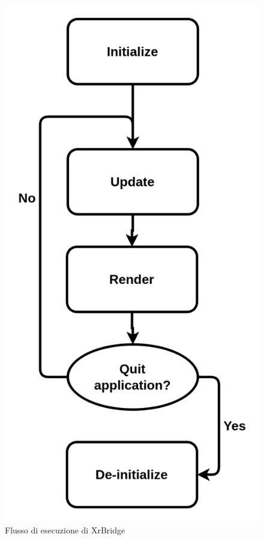 \documentclass[twoside]{supsistudent}
\begin{document}
\begin{figure}[H]
  \caption{Flusso di esecuzione di XrBridge}
  \centering
  \includegraphics[scale=0.2]{resources/flow.png}
\end{figure}
\end{document}
